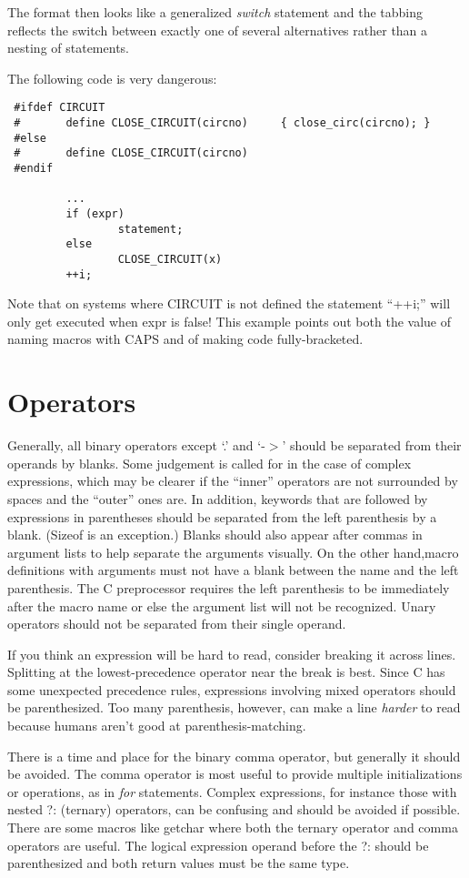 The format then looks like a generalized {\em switch} statement and the
tabbing reflects the switch between exactly one of several alternatives
rather than a nesting of statements. 

The following code is very dangerous: 

\begin{verbatim}
 #ifdef CIRCUIT
 #       define CLOSE_CIRCUIT(circno)     { close_circ(circno); }
 #else
 #       define CLOSE_CIRCUIT(circno)
 #endif

         ...
         if (expr)
                 statement;
         else
                 CLOSE_CIRCUIT(x)
         ++i;
\end{verbatim}

Note that on systems where CIRCUIT is not defined the statement ``++i;'' will
only get executed when expr is false! This example points out both the value
of naming macros with CAPS and of making code fully-bracketed. 
\newpage
\section{Operators}

 Generally, all binary operators except `.' and `-$>$' should be
separated from their operands by blanks. Some judgement is called
for in the case of complex expressions, which may be clearer if the
``inner'' operators are not surrounded by spaces and the ``outer''
ones are. In addition, keywords that are followed by expressions in
parentheses should be separated from the left parenthesis by a blank.
(Sizeof is an exception.) Blanks should also appear after commas in
argument lists to help separate the arguments visually. On the other
hand,macro definitions with arguments must not have a blank between
the name and the left parenthesis. The C preprocessor requires the
left parenthesis to be immediately after the macro name or else the
argument list will not be recognized. Unary operators should not be
separated from their single operand. 

If you think an expression will be hard to read, consider breaking
it across lines. Splitting at the lowest-precedence operator near the
break is best. Since C has some unexpected precedence rules,
expressions involving mixed operators should be parenthesized. Too many
parenthesis, however, can make a line {\em harder} to read because
humans aren't good at parenthesis-matching. 

 There is a time and place for the binary comma operator, but generally it
should be avoided. The comma operator is most useful to provide multiple
initializations or operations, as in {\em for} statements. Complex
expressions, for instance those with nested ?: (ternary) operators,
can be confusing and should be avoided if possible. There are some
macros like getchar where both the ternary operator and comma operators
are useful. The logical expression operand before the ?: should be
parenthesized and both return values must be the same type. 
\newpage
